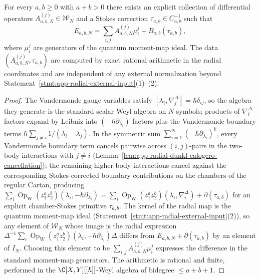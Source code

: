 \begin{lem}
\label{lem:completion-stokes-correction}
For every \(a,b\ge 0\) with \(a+b>0\) there exists an explicit
collection of differential operators
\(A^{(j)}_{a,b,N}\in\mathcal W_N\) and a Stokes correction
\(\tau_{a,b}\in C^{-1}_{a,b}\) such that
\[
  E_{a,b,N}=\sum_{i,j}A^{(j)}_{a,b,N}\mu^j_i+B_{a,b}(\tau_{a,b}),
\]
where \(\mu^j_i\) are generators of the quantum moment-map ideal.
The data \((A^{(j)}_{a,b,N},\tau_{a,b})\) are computed by exact
rational arithmetic in the radial coordinates and are independent
of any external normalization beyond
Statement~\ref{stmt:app-radial-external-input}(1)--(2).
\end{lem}

\begin{proof}
The Vandermonde gauge variables satisfy
\([\lambda_i,\nabla^\Delta_j]=\hbar\delta_{ij}\), so the algebra they
generate is the standard scalar Weyl algebra on \(N\) symbols;
products of \(\nabla^\Delta_i\) factors expand by Leibniz into
\((-\hbar\partial_{\lambda_i})\) factors plus the Vandermonde
boundary terms
\(\hbar\sum_{j\neq i}1/(\lambda_i-\lambda_j)\).  In the symmetric
sum
\(\sum_{i=1}^N(-\hbar\partial_{\lambda_i})^k\), every Vandermonde
boundary term cancels pairwise across \((i,j)\)-pairs in the
two-body interactions with \(j\neq i\)
(Lemma~\ref{lem:app-radial-dunkl-calogero-cancellation}); the
remaining higher-body interactions cancel against the corresponding
Stokes-corrected boundary contributions on the chambers of the
regular Cartan, producing
\(\sum_{i}\operatorname{Op}_{\mathrm W}(z_1^az_2^b)
(\lambda_i,-\hbar\partial_{\lambda_i})
=\sum_i\operatorname{Op}_{\mathrm W}(z_1^az_2^b)
(\lambda_i,\nabla^\Delta_i)+\partial(\tau_{a,b})\) for an explicit
chamber-Stokes primitive \(\tau_{a,b}\).  The kernel of the radial
map is the quantum moment-map ideal
(Statement~\ref{stmt:app-radial-external-input}(2)), so any element
of \(\mathcal W_N\) whose image is the radial expression
\(\Delta^{-1}\sum_i\operatorname{Op}_{\mathrm W}(z_1^az_2^b)
(\lambda_i,-\hbar\partial_{\lambda_i})\Delta\) differs from
\(E_{a,b,N}+\partial(\tau_{a,b})\) by an element of \(I_N\).
Choosing this element to be \(\sum_{i,j}A^{(j)}_{a,b,N}\mu^j_i\)
expresses the difference in the standard moment-map generators.
The arithmetic is rational and finite, performed in the
\(\C[X,Y][[\hbar]]\)-Weyl algebra of bidegree \(\le a+b+1\).
\end{proof}

